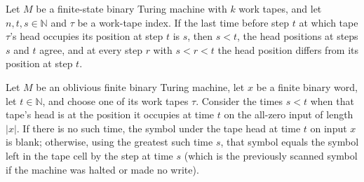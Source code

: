 \begin{lemma}
\label{Complexity.prevVisit_some_last}
\leanok
{}
Let $M$ be a finite-state binary Turing machine with $k$ work tapes, and let
$n,t,s\in\mathbb{N}$ and $\tau$ be a work-tape index. If the last time before step $t$
at which tape $\tau$'s head occupies its position at step $t$ is $s$, then $s<t$, the
head positions at steps $s$ and $t$ agree, and at every step $r$ with $s<r<t$ the head
position differs from its position at step $t$.
\end{lemma}

\begin{theorem}
\label{Complexity.snapshotAt_workSymbol}
\leanok
{}
Let $M$ be an oblivious finite binary Turing machine, let $x$ be a finite binary word,
let $t\in\mathbb{N}$, and choose one of its work tapes $\tau$. Consider the times $s<t$
when that tape's head is at the position it occupies at time $t$ on the all-zero input
of length $|x|$. If there is no such time, the symbol under the tape head at time $t$ on
input $x$ is blank; otherwise, using the greatest such time $s$, that symbol equals the
symbol left in the tape cell by the step at time $s$ (which is the previously scanned
symbol if the machine was halted or made no write).
\end{theorem}
